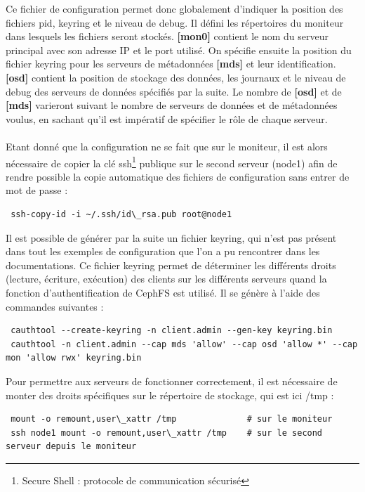 \documentclass[12pt]{report}
\begin{document}
                        Ce fichier de configuration permet donc globalement d'indiquer la position des fichiers pid, keyring et le niveau de debug. Il défini les répertoires du moniteur dans lesquels les fichiers seront stockés. \textbf{[mon0]} contient le nom du serveur principal avec son adresse IP et le port utilisé. On spécifie ensuite la position du fichier keyring pour les serveurs de métadonnées \textbf{[mds]} et leur identification. \textbf{[osd]} contient la position de stockage des données, les journaux et le niveau de debug des serveurs de données spécifiés par la suite. Le nombre de \textbf{[osd]} et de \textbf{[mds]} varieront suivant le nombre de serveurs de données et de métadonnées voulus, en sachant qu'il est impératif de spécifier le rôle de chaque serveur.\\\\
                        Etant donné que la configuration ne se fait que sur le moniteur, il est alors nécessaire de copier la clé ssh\footnote{Secure Shell : protocole de communication sécurisé} publique sur le second serveur (node1) afin de rendre possible la copie automatique des fichiers de configuration sans entrer de mot de passe :
                        \begin{lstlisting}
 ssh-copy-id -i ~/.ssh/id\_rsa.pub root@node1
                        \end{lstlisting}
                        Il est possible de générer par la suite un fichier keyring, qui n'est pas présent dans tout les exemples de configuration que l'on a pu rencontrer dans les documentations. Ce fichier keyring permet de déterminer les différents droits (lecture, écriture, exécution) des clients sur les différents serveurs quand la fonction d'authentification de CephFS est utilisé. Il se génère à l'aide des commandes suivantes :
                        \begin{lstlisting}
 cauthtool --create-keyring -n client.admin --gen-key keyring.bin
 cauthtool -n client.admin --cap mds 'allow' --cap osd 'allow *' --cap mon 'allow rwx' keyring.bin
                        \end{lstlisting}
                        Pour permettre aux serveurs de fonctionner correctement, il est nécessaire de monter des droits spécifiques sur le répertoire de stockage, qui est ici /tmp :
                        \begin{lstlisting}
 mount -o remount,user\_xattr /tmp              # sur le moniteur
 ssh node1 mount -o remount,user\_xattr /tmp    # sur le second serveur depuis le moniteur
                        \end{lstlisting}
\end{document}
